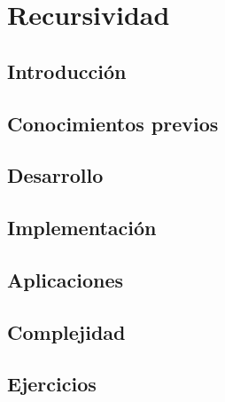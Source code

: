 \chapter{Recursividad}
\section{Introducción}

\section{Conocimientos previos}

\section{Desarrollo}

\section{Implementación}

\section{Aplicaciones}

\section{Complejidad}

\section{Ejercicios}
